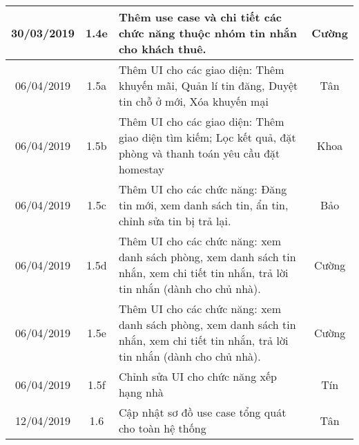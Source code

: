 \begin{center}
\begin{longtable}{ | c | c | p{5cm} |c|}
		30/03/2019 & 1.4e & Thêm use case và chi tiết các chức năng thuộc nhóm tin nhắn cho khách thuê. & Cường \\ \hline
		
		06/04/2019 & 1.5a & Thêm UI cho các giao diện: Thêm khuyến mãi, Quản lí tin đăng, Duyệt tin chỗ ở mới, Xóa khuyến mại & Tân \\ \hline 
		06/04/2019 & 1.5b & Thêm UI cho các giao diện: Thêm giao diện tìm kiếm; Lọc kết quả, đặt phòng và thanh toán yêu cầu đặt homestay & Khoa \\ \hline
		06/04/2019 & 1.5c & Thêm UI cho các chức năng: Đăng tin mới, xem danh sách tin, ẩn tin, chỉnh sửa tin bị trả lại. & Bảo \\ \hline
		06/04/2019 & 1.5d & Thêm UI cho các chức năng: xem danh sách phòng, xem danh sách tin nhắn, xem chi tiết tin nhắn, trả lời tin nhắn (dành cho chủ nhà). & Cường \\ \hline
		06/04/2019 & 1.5e & Thêm UI cho các chức năng: xem danh sách phòng, xem danh sách tin nhắn, xem chi tiết tin nhắn, trả lời tin nhắn (dành cho chủ nhà). & Cường \\ \hline
		06/04/2019 & 1.5f & Chỉnh sửa UI cho chức năng xếp hạng nhà & Tín \\ \hline
		12/04/2019 & 1.6 & Cập nhật sơ đồ use case tổng quát cho toàn hệ thống & Tân \\ \hline
		\end{longtable}
\end{center}